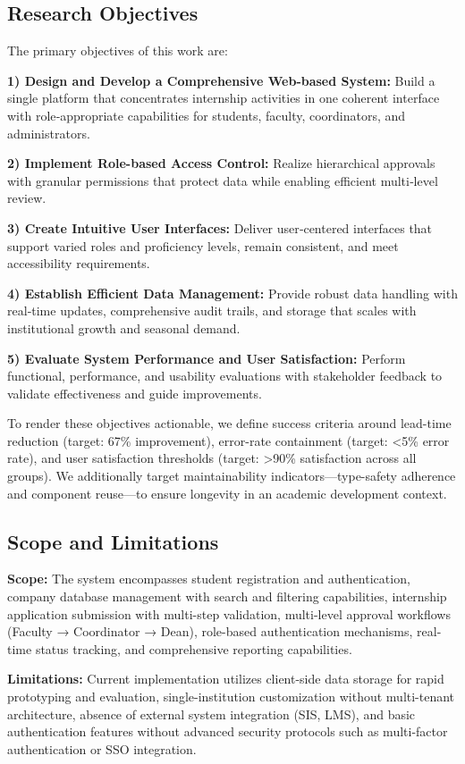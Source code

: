 \documentclass[conference]{IEEEtran}
\begin{document}
\subsection{Research Objectives}
The primary objectives of this work are:

\textbf{1) Design and Develop a Comprehensive Web-based System:} Build a single platform that concentrates internship activities in one coherent interface with role‑appropriate capabilities for students, faculty, coordinators, and administrators.

\textbf{2) Implement Role-based Access Control:} Realize hierarchical approvals with granular permissions that protect data while enabling efficient multi‑level review.

\textbf{3) Create Intuitive User Interfaces:} Deliver user‑centered interfaces that support varied roles and proficiency levels, remain consistent, and meet accessibility requirements.

\textbf{4) Establish Efficient Data Management:} Provide robust data handling with real‑time updates, comprehensive audit trails, and storage that scales with institutional growth and seasonal demand.

\textbf{5) Evaluate System Performance and User Satisfaction:} Perform functional, performance, and usability evaluations with stakeholder feedback to validate effectiveness and guide improvements.

To render these objectives actionable, we define success criteria around lead-time reduction (target: 67\% improvement), error-rate containment (target: <5\% error rate), and user satisfaction thresholds (target: >90\% satisfaction across all groups). We additionally target maintainability indicators—type-safety adherence and component reuse—to ensure longevity in an academic development context.

\subsection{Scope and Limitations}
\textbf{Scope:} The system encompasses student registration and authentication, company database management with search and filtering capabilities, internship application submission with multi-step validation, multi-level approval workflows (Faculty → Coordinator → Dean), role-based authentication mechanisms, real-time status tracking, and comprehensive reporting capabilities.

\textbf{Limitations:} Current implementation utilizes client-side data storage for rapid prototyping and evaluation, single-institution customization without multi-tenant architecture, absence of external system integration (SIS, LMS), and basic authentication features without advanced security protocols such as multi-factor authentication or SSO integration.
\end{document}

